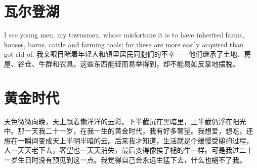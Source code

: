 \documentclass[UTF8]{ctexart}
\begin{document}
\section{瓦尔登湖}
I see young men, my townsmen, whose misfortune it is to have inherited farms, houses, barns, cattle and farming tools; for these are more easily acquired than got rid of.
我亲眼目睹着年轻人和镇里居民同胞们的不幸——他们继承了土地、房屋、谷仓、牛群和农具。这些东西能轻而易举得到，却不能易如反掌地摆脱。

\section{黄金时代}
天色微微向晚，天上飘着懒洋洋的云彩。下半截沉在黑暗里，上半截仍浮在阳光中。那一天我二十一岁，在我一生的黄金时代，我有好多奢望。我想爱，想吃，还想在一瞬间变成天上半明半暗的云。后来我才知道，生活就是个缓慢受槌的过程，人一天天老下去，奢望也一天天消失，最后变得像挨了槌的牛一样。可是我过二十一岁生日时没有预见到这一点。我觉得自己会永远生猛下去，什么也槌不了我。
\end{document}
